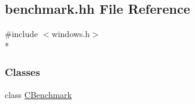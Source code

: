 \hypertarget{benchmark_8hh}{}\subsection{benchmark.\+hh File Reference}
\label{benchmark_8hh}
{\ttfamily \#include $<$windows.\+h$>$}\\*
\subsubsection*{Classes}
\begin{DoxyCompactItemize}
\item 
class \hyperlink{class_c_benchmark}{C\+Benchmark}
\end{DoxyCompactItemize}
